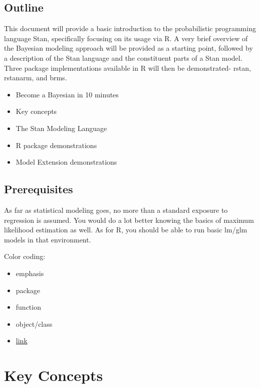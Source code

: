 \documentclass[]{book}
\providecommand{\tightlist}{%
  \setlength{\itemsep}{0pt}\setlength{\parskip}{0pt}}
\begin{document}
\section{Outline}\label{outline}

This document will provide a basic introduction to the probabilistic
programming language Stan, specifically focusing on its usage via R. A
very brief overview of the Bayesian modeling approach will be provided
as a starting point, followed by a description of the Stan language and
the constituent parts of a Stan model. Three package implementations
available in R will then be demonstrated- {rstan}, {rstanarm}, and
{brms}.

\begin{itemize}
\tightlist
\item
  Become a Bayesian in 10 minutes
\item
  Key concepts
\item
  The Stan Modeling Language
\item
  R package demonstrations
\item
  Model Extension demonstrations
\end{itemize}

\hypertarget{prerequisites}{\section*{Prerequisites}\label{prerequisites}}

As far as statistical modeling goes, no more than a standard exposure to
regression is assumed. You would do a lot better knowing the basics of
maximum likelihood estimation as well. As for R, you should be able to
run basic lm/glm models in that environment.

Color coding:

\begin{itemize}
\tightlist
\item
  {emphasis}
\item
  {package}
\item
  {function}
\item
  {object/class}
\item
  \protect\hyperlink{prerequisites}{link}
\end{itemize}

\chapter{Key Concepts}\label{key-concepts}
\end{document}
